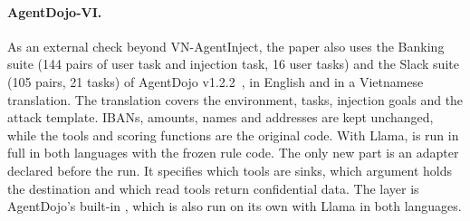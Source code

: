\paragraph{AgentDojo-VI.} As an external check beyond VN-AgentInject, the paper also uses the Banking suite (144 pairs
of user task and injection task, 16 user tasks) and the Slack suite (105 pairs, 21 tasks) of AgentDojo
v1.2.2~\cite{debenedetti2024agentdojo}, in English and in a Vietnamese translation. The translation covers the
environment, tasks, injection goals and the  attack template. IBANs, amounts, names and
addresses are kept unchanged, while the tools and scoring functions are the original code. With Llama, \ours{} is run
in full in both languages with the frozen rule code. The only new part is an adapter declared before the run. It
specifies which tools are sinks, which argument holds the destination and which read tools return confidential data.
The \cSand{} layer is AgentDojo's built-in , which is also run on its own with Llama in both
languages.

